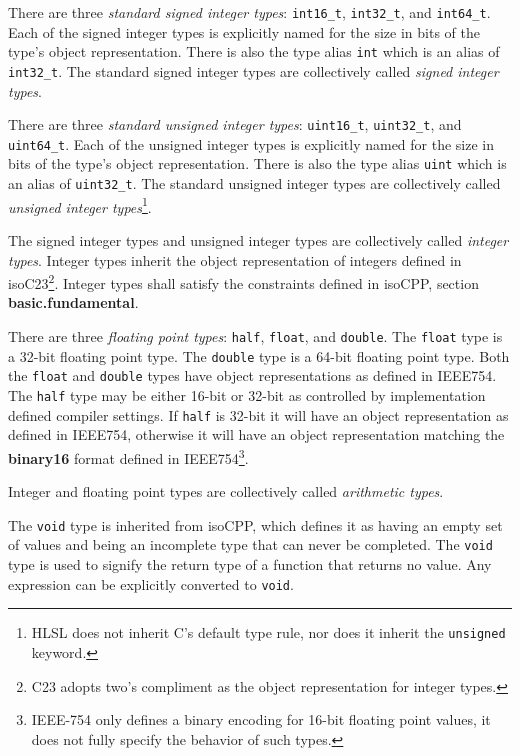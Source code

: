 \p There are three \textit{standard signed integer types}: \texttt{int16\_t},
\texttt{int32\_t}, and \texttt{int64\_t}. Each of the signed integer types is
explicitly named for the size in bits of the type's object representation. There
is also the type alias \texttt{int} which is an alias of \texttt{int32\_t}. The
standard signed integer types are collectively called \textit{signed integer
types}.

\p There are three \textit{standard unsigned integer types}: \texttt{uint16\_t},
\texttt{uint32\_t}, and \texttt{uint64\_t}. Each of the unsigned integer types is
explicitly named for the size in bits of the type's object representation. There
is also the type alias \texttt{uint} which is an alias of \texttt{uint32\_t}. The
standard unsigned integer types are collectively called \textit{unsigned integer
types}\footnote{HLSL does not inherit C's default type rule, nor does it
inherit the \texttt{unsigned} keyword.}.

\p The signed integer types and unsigned integer types are collectively called
\textit{integer types}. Integer types inherit the object representation of
integers defined in \glsdesc{isoC23}\footnote{C23 adopts two's compliment as the
object representation for integer types.}. Integer types shall satisfy the
constraints defined in \glsdesc{isoCPP}, section \textbf{basic.fundamental}.

\p There are three \textit{floating point types}: \texttt{half}, \texttt{float},
and \texttt{double}. The \texttt{float} type is a 32-bit floating point type.
The \texttt{double} type is a 64-bit floating point type. Both the
\texttt{float} and \texttt{double} types have object representations as defined
in \gls{IEEE754}. The \texttt{half} type may be either 16-bit or 32-bit as
controlled by implementation defined compiler settings. If \texttt{half} is
32-bit it will have an object representation as defined in \gls{IEEE754},
otherwise it will have an object representation matching the \textbf{binary16}
format defined in \gls{IEEE754}\footnote{IEEE-754 only defines a binary encoding
for 16-bit floating point values, it does not fully specify the behavior of such
types.}.

\p Integer and floating point types are collectively called \textit{arithmetic
types}.

\p The \texttt{void} type is inherited from \gls{isoCPP}, which defines it as
having an empty set of values and being an incomplete type that can never be
completed. The \texttt{void} type is used to signify the return type of a
function that returns no value. Any expression can be explicitly converted to
\texttt{void}.

